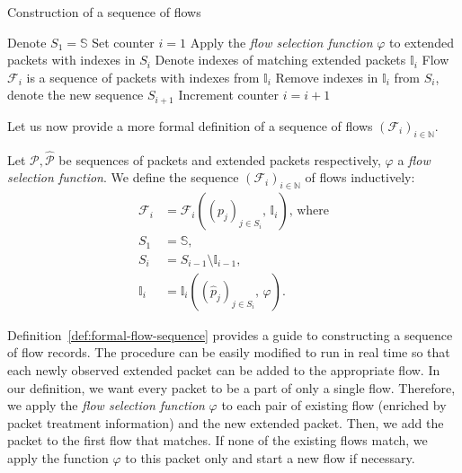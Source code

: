 \begin{algorithm}
    \caption{Construction of a sequence of flows}
    \label{alg:flow-sequence-construction}
    \begin{algorithmic}[1]
        \STATE Denote $S_1 = \mathbb{S}$
        \STATE Set counter $i = 1$
        \REPEAT
            \STATE Apply the \emph{flow selection function} $\varphi$ to extended packets with indexes in $S_i$
            \STATE Denote indexes of matching extended packets $\mathbb{I}_i$
            \STATE Flow $\mathcal{F}_i $ is a sequence of packets with indexes from $\mathbb{I}_i$
            \STATE Remove indexes in $\mathbb{I}_i$ from $S_i$, denote the new sequence $S_{i+1}$
            \STATE Increment counter $i = i + 1$
    \end{algorithmic}
\end{algorithm}

Let us now provide a more formal definition of a sequence of flows $(\mathcal{F}_i)_{i \in \mathbb{N}}$.
\begin{defn}\label{def:formal-flow-sequence}
Let $\mathcal{P}, \widehat{\mathcal{P}}$ be sequences of packets and extended packets respectively, $\varphi$ a \emph{flow selection function}. We define the sequence $(\mathcal{F}_i)_{i \in \mathbb{N}}$ of flows inductively:
\begin{align*}
    \mathcal{F}_i &= \mathcal{F}_i\left((p_j)_{j\in S_i},\, \mathbb{I}_i\right) \text{, where} \\
    S_1 &= \mathbb{S}, \\
    S_i &= S_{i-1} \setminus \mathbb{I}_{i-1}, \\
    \mathbb{I}_{i} &= \mathbb{I}_i\left((\widehat{p}_j)_{j \in S_i},\, \varphi\right).
\end{align*}
\end{defn}

Definition~\ref{def:formal-flow-sequence} provides a guide to constructing a sequence of flow records. The procedure can be easily modified to run in real time so that each newly observed extended packet can be added to the appropriate flow. In our definition, we want every packet to be a part of only a single flow. Therefore, we apply the \emph{flow selection function} $\varphi$ to each pair of existing flow (enriched by packet treatment information) and the new extended packet. Then, we add the packet to the first flow that matches. If none of the existing flows match, we apply the function $\varphi$ to this packet only and start a new flow if necessary. 

